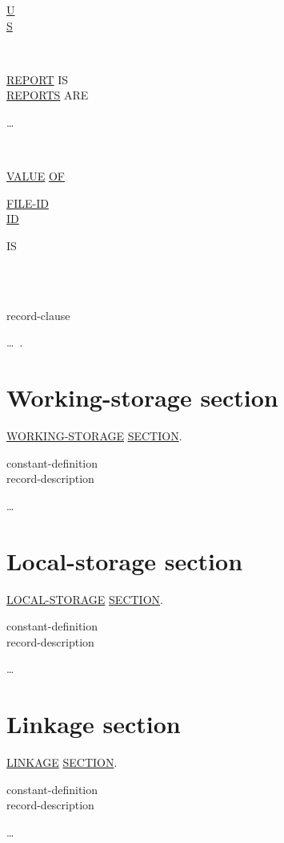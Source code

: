 \documentclass[a4paper,oneside,svgnames]{scrbook}
\makeatletter
\newcommand{\key}[1]{\underline{#1}}
\newcommand{\deleted}[1]{%
  \colorbox{red!75}{#1}}
\newcommand{\pending}[1]{%
  \textcolor{gray!75}{#1}}
\newenvironment{0-1}{$\left[ \begin{tabular}{@{}l@{}}}{\end{tabular} \right]$}
\newenvironment{1=}{$\left\{ \begin{tabular}{@{}l@{}}}{\end{tabular} \right\}$}
\makeatother
\begin{document}
\begin{0-1}
{\begin{1=}
      \key{U} \\
      \key{S}
    \end{1=}
  } \\

  \pending{
    \begin{1=}
      \key{REPORT} IS \\
      \key{REPORTS} ARE
    \end{1=}
    \begin{1=}
      \identifier
    \end{1=}\ldots
  } \\

  \deleted{
    \key{VALUE} \key{OF}
    \begin{1=}
      \key{FILE-ID} \\
      \key{ID} \\
      \identifier
    \end{1=}
    IS
    \begin{1=}
      \literal \\
      \identifier
    \end{1=}
  } \\

  record-clause
\end{0-1}\ldots\ {}.

\section{Working-storage section}
\key{WORKING-STORAGE} \key{SECTION}.\newline
\begin{0-1}
  constant-definition \\
  record-description
\end{0-1}\ldots

\section{Local-storage section}
\key{LOCAL-STORAGE} \key{SECTION}.\newline
\begin{0-1}
  constant-definition \\
  record-description
\end{0-1}\ldots

\section{Linkage section}
\key{LINKAGE} \key{SECTION}.\newline
\begin{0-1}
  constant-definition \\
  record-description
\end{0-1}\ldots
\end{document}

